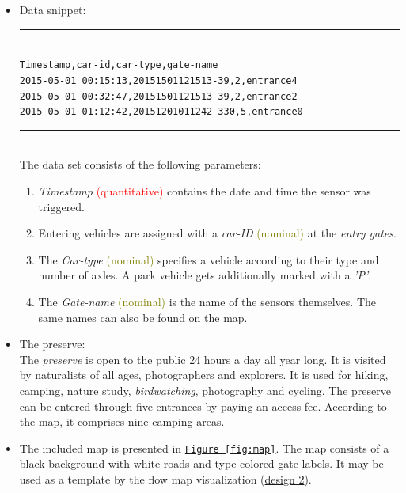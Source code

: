 \documentclass{article}
\begin{document}
\begin{itemize}
\item Data snippet:\\
	\noindent\rule{9.3cm}{1pt}\\
	\texttt{Timestamp,car-id,car-type,gate-name}\\
	\texttt{2015-05-01 00:15:13,20151501121513-39,2,entrance4}\\
	\texttt{2015-05-01 00:32:47,20151501121513-39,2,entrance2}\\
	\texttt{2015-05-01 01:12:42,20151201011242-330,5,entrance0}\\
	\noindent\rule{9.3cm}{1pt}\\

	The data set consists of the following parameters:

	\begin{enumerate}
	\item \textit{Timestamp} \textcolor{red}{(quantitative)} contains the date and time the sensor was triggered.
	\item Entering vehicles are assigned with a \textit{car-ID} \textcolor{olive}{(nominal)} at the \textit{entry gates}.
	\item The \textit{Car-type} \textcolor{olive}{(nominal)} specifies a vehicle according to their type and number of axles. A park vehicle gets additionally marked with a \textit{'P'}.
	\item The \textit{Gate-name} \textcolor{olive}{(nominal)} is the name of the sensors themselves. The same names can also be found on the map.
	\end{enumerate}

\item The preserve:\\
	The \textit{preserve} is open to the public 24 hours a day all year long. It is visited by naturalists of all ages, photographers and explorers. It is used for hiking, camping, nature study, \textit{birdwatching}, photography and cycling. The preserve can be entered through five entrances by paying an access fee. According to the map, it comprises nine camping areas.

\item The included map is presented in \texttt{\hyperref[fig:map]{Figure~\ref{fig:map}}}.
The map consists of a black background with white roads and type-colored gate labels. It may be used as a template by the flow map visualization (\hyperref[fig:design2]{design 2}).


\end{itemize}
\end{document}
